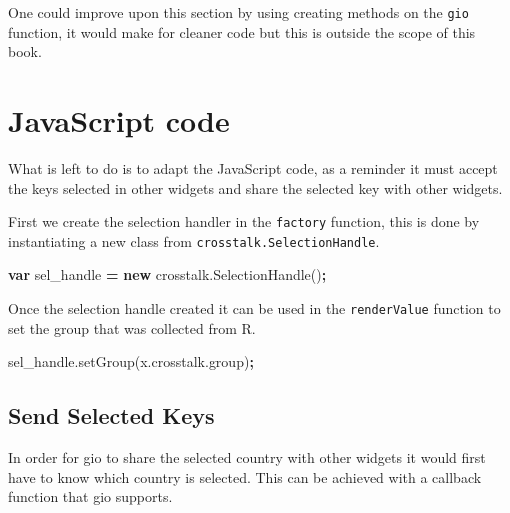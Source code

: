 \documentclass[
]{krantz}
\makeatletter
\newenvironment{Shaded}{\begin{snugshade}}{\end{snugshade}}
\newcommand{\AttributeTok}[1]{\textcolor[rgb]{0.61,0.61,0.61}{#1}}
\newcommand{\KeywordTok}[1]{\textcolor[rgb]{0.27,0.27,0.27}{\textbf{#1}}}
\newcommand{\NormalTok}[1]{#1}
\newcommand{\OperatorTok}[1]{\textcolor[rgb]{0.43,0.43,0.43}{\textbf{#1}}}
\newcommand{\VariableTok}[1]{\textcolor[rgb]{0,0,0}{#1}}
\newenvironment{kframe}{%
\medskip{}
\setlength{\fboxsep}{.8em}
 \def\at@end@of@kframe{}%
 \ifinner\ifhmode%
  \def\at@end@of@kframe{\end{minipage}}%
  \begin{minipage}{\columnwidth}%
 \fi\fi%
 \def\FrameCommand##1{\hskip\@totalleftmargin \hskip-\fboxsep
 \colorbox{shadecolor}{##1}\hskip-\fboxsep
     \hskip-\linewidth \hskip-\@totalleftmargin \hskip\columnwidth}%
 \MakeFramed {\advance\hsize-\width
   \@totalleftmargin\z@ \linewidth\hsize
   \@setminipage}}%
 {\par\unskip\endMakeFramed%
 \at@end@of@kframe}
\renewenvironment{Shaded}{\begin{kframe}}{\end{kframe}}
\newenvironment{rmdblock}[1]
  {
  \begin{itemize}
  \renewcommand{\labelitemi}{
    \raisebox{-.7\height}[0pt][0pt]{
      {\setkeys{Gin}{width=3em,keepaspectratio}\texttt{[image: images/\#1]}}
    }
  }
  \setlength{\fboxsep}{1em}
  \begin{kframe}
  \item
  }
  {
  \end{kframe}
  \end{itemize}
  }
\newenvironment{rmdnote}
  {\begin{rmdblock}{note}}
  {\end{rmdblock}}
\makeatother
\begin{document}
\begin{rmdnote}
One could improve upon this section by using creating methods on the
\texttt{gio} function, it would make for cleaner code but this is
outside the scope of this book.
\end{rmdnote}

\hypertarget{linking-widgets-js}{%
\section{JavaScript code}\label{linking-widgets-js}}

What is left to do is to adapt the JavaScript code, as a reminder it must accept the keys selected in other widgets and share the selected key with other widgets.

First we create the selection handler in the \texttt{factory} function, this is done by instantiating a new class from \texttt{crosstalk.SelectionHandle}.

\begin{Shaded}
\begin{Highlighting}[]
\KeywordTok{var}\NormalTok{ sel\_handle }\OperatorTok{=} \KeywordTok{new} \VariableTok{crosstalk}\NormalTok{.}\AttributeTok{SelectionHandle}\NormalTok{()}\OperatorTok{;}
\end{Highlighting}
\end{Shaded}

Once the selection handle created it can be used in the \texttt{renderValue} function to set the group that was collected from R.

\begin{Shaded}
\begin{Highlighting}[]
\VariableTok{sel\_handle}\NormalTok{.}\AttributeTok{setGroup}\NormalTok{(}\VariableTok{x}\NormalTok{.}\VariableTok{crosstalk}\NormalTok{.}\AttributeTok{group}\NormalTok{)}\OperatorTok{;}
\end{Highlighting}
\end{Shaded}

\hypertarget{linking-widgets-send-keys}{%
\subsection{Send Selected Keys}\label{linking-widgets-send-keys}}

In order for gio to share the selected country with other widgets it would first have to know which country is selected. This can be achieved with a callback function that gio supports.
\end{document}
